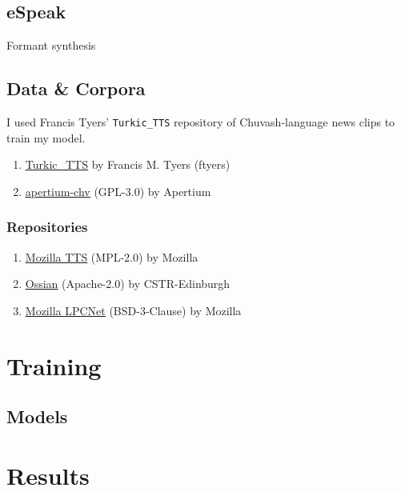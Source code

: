 \documentclass[11pt,a4paper]{article}
\begin{document}
\subsection{eSpeak}\label{ssec:espeak}
Formant synthesis

\subsection{Data \& Corpora}\label{ssec:data}
I used Francis Tyers' \texttt{Turkic\_TTS} repository of Chuvash-language news clips to train my model.

\begin{enumerate}
	\item \href{https://github.com/ftyers/Turkic_TTS}{\underline{Turkic\_TTS}} by Francis M. Tyers (ftyers)
	\item \href{https://github.com/apertium/apertium-chv}{\underline{apertium-chv}} (GPL-3.0) by Apertium
\end{enumerate}

\subsubsection{Repositories} %
\begin{enumerate}
	\item \href{https://github.com/mozilla/TTS}{\underline{Mozilla TTS}} (MPL-2.0) by Mozilla
	\item \href{https://github.com/CSTR-Edinburgh/Ossian}{\underline{Ossian}} (Apache-2.0) by CSTR-Edinburgh
	\item \href{https://github.com/mozilla/LPCNet}{\underline{Mozilla LPCNet}} (BSD-3-Clause) by Mozilla
\end{enumerate}

\section{Training}


\subsection{Models}\label{ssec:models}


\section{Results}\label{sect:results}
\end{document}
